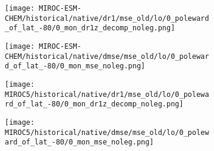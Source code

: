 \documentclass[preview]{standalone}
\begin{document}
\begin{figure}
  \begin{subfigure}[t]{0.5\textwidth}
    \texttt{[image: MIROC-ESM-CHEM/historical/native/dr1/mse\_old/lo/0\_poleward\_of\_lat\_-80/0\_mon\_dr1z\_decomp\_noleg.png]}
  \end{subfigure}
  \begin{subfigure}[t]{0.5\textwidth}
    \texttt{[image: MIROC-ESM-CHEM/historical/native/dmse/mse\_old/lo/0\_poleward\_of\_lat\_-80/0\_mon\_mse\_noleg.png]}
  \end{subfigure}
\end{figure}

\begin{figure}
  \begin{subfigure}[t]{0.5\textwidth}
    \texttt{[image: MIROC5/historical/native/dr1/mse\_old/lo/0\_poleward\_of\_lat\_-80/0\_mon\_dr1z\_decomp\_noleg.png]}
  \end{subfigure}
  \begin{subfigure}[t]{0.5\textwidth}
    \texttt{[image: MIROC5/historical/native/dmse/mse\_old/lo/0\_poleward\_of\_lat\_-80/0\_mon\_mse\_noleg.png]}
  \end{subfigure}
\end{figure}
\end{document}
